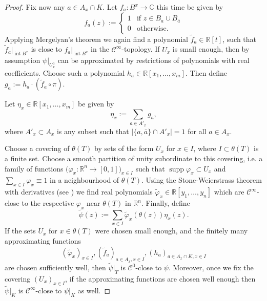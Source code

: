 \documentclass{amsart}
\theoremstyle{plain}
\theoremstyle{definition}
\theoremstyle{remark}
\numberwithin{equation}{thm} %
\newcommand{\R}{\mathbb{R}}
\newcommand{\C}{\mathbb{C}}
\DeclareMathOperator{\Int}{int}
\DeclareMathOperator{\supp}{supp}
\begin{document}
\begin{proof}
Fix now any $a\in A_x\cap K$. Let $f_a:B^x\rightarrow \C$ this time be given by 
\begin{equation*}
    f_a(z):=\begin{cases}
        1 & \text{if }z\in B_a\cup B_{\bar a} \\
        0 & \text{otherwise}.
    \end{cases}
\end{equation*}
Applying Mergelyan's theorem we again find a polynomial $\tilde f_a\in \R[t]$, such that $\tilde f_a\vert_{\Int B^x}$ is close to $f_a\vert_{\Int B^x}$ in the $\mathcal C^\infty$-topology. If $U_x$ is small enough, then by assumption $\psi\vert_{U_x^a}$ can be approximated by restrictions of polynomials with real coefficients. Choose such a polynomial $h_a\in \R[x_1,\dots,x_m]$. Then define $g_a:=h_a\cdot(\tilde f_a\circ \pi)$.

Let $\eta_x\in \R[x_1,\dots,x_m]$ be given by
\begin{equation*}
    \eta_x:=\sum_{a\in A'_x}g_a,
\end{equation*}
where $A'_x\subset A_x$ is any subset such that $|\{a,\bar a\}\cap A'_x|=1$ for all $a\in A_x$.

Choose a covering of $\theta(T)$ by sets of the form $U_x$ for $x\in I$, where $I\subset \theta(T)$ is a finite set. Choose a smooth partition of unity subordinate to this covering, i.e. a family of functions $\big(\varphi_x:\R^n\rightarrow [0,1]\big)_{x\in I}$ such that $\supp \varphi_x \subset U_x$ and $\sum_{x\in I}\varphi_x\equiv 1$ in a neighbourhood of $\theta(T)$. Using the Stone-Weierstrass theorem with derivatives (see \cite[Theorem 8.8.5]{bochnakRealAlgebraicGeometry1998}) we find real polynomials $\tilde \varphi_x\in \R[y_1,\dots,y_n]$ which are $\mathcal C^\infty$-close to the respective $\varphi_x$ near $\theta(T)$ in $\R^n$. Finally, define
\begin{equation*}
    \tilde \psi(z):=\sum_{x\in I} \tilde \varphi_x(\theta(z))\eta_x(z).
\end{equation*}
If the sets $U_x$ for $x\in \theta(T)$ were chosen small enough, and the finitely many approximating functions 
\begin{equation*}
    (\tilde \varphi_x)_{x\in I},(\tilde f_a)_{a\in A_x,x\in I},(h_a)_{a\in A_x\cap K,x\in I}
\end{equation*}
are chosen sufficiently well, then $\tilde \psi\vert_T$ is $\mathcal C^0$-close to $\psi$. Moreover, once we fix the covering $(U_x)_{x\in I}$, if the approximating functions are chosen well enough then $\tilde \psi\vert_K$ is $\mathcal C^\infty$-close to $\psi\vert_K$ as well.
\end{proof}
\end{document}
